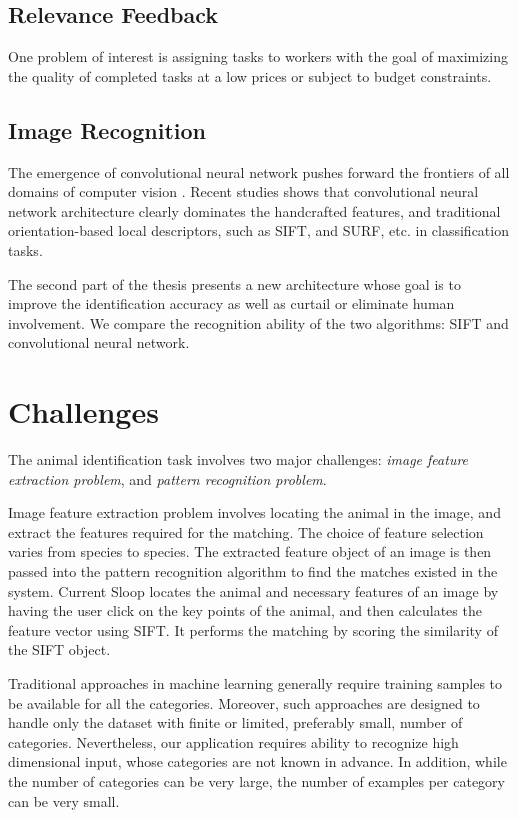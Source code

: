 \subsection{Relevance Feedback} %
\label{sub:relevance_feedback}
One problem of interest is assigning tasks to workers with the goal of maximizing the quality of completed tasks at a low prices or subject to budget constraints.

\subsection{Image Recognition} %
\label{sub:image_recognition}
The emergence of convolutional neural network pushes forward the frontiers of all domains of computer vision \cite{lecun95}. Recent studies shows that convolutional neural network architecture clearly dominates the handcrafted features, and traditional orientation-based local descriptors, such as SIFT\cite{lowe04}, and SURF\cite{surf08}, etc. in classification tasks\cite{fisher14,kriz12,prelu15,ILSVRC15}.

The second part of the thesis presents a new architecture whose goal is to improve the identification accuracy as well as curtail or eliminate human involvement. We compare the recognition ability of the two algorithms: SIFT and convolutional neural network. 

\section{Challenges}

The animal identification task involves two major challenges: \emph{image feature extraction problem}, and \emph{pattern recognition problem}. 

Image feature extraction problem involves locating the animal in the image, and extract the features required for the matching. The choice of feature selection varies from species to species. The extracted feature object of an image is then passed into the pattern recognition algorithm to find the matches existed in the system. Current Sloop locates the animal and necessary features of an image by having the user click on the key points of the animal, and then calculates the feature vector using SIFT. It performs the matching by scoring the similarity of the SIFT object. 

Traditional approaches in machine learning generally require training samples to be available for all the categories. Moreover, such approaches are designed to handle only the dataset with finite or limited, preferably small, number of categories. Nevertheless, our application requires ability to recognize high dimensional input, whose categories are not known in advance. In addition, while the number of categories can be very large, the number of examples per category can be very small.
